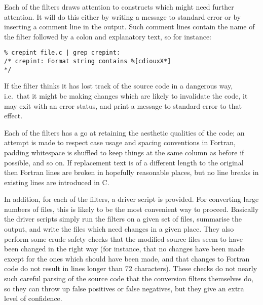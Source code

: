 \documentclass[twoside,11pt]{article}
\renewcommand{\_}{\texttt{\symbol{95}}}
\begin{document}
Each of the filters draws attention to constructs which might need 
further attention.  It will do this either by writing a message to
standard error or by inserting a comment line in the output.
Such comment lines contain the name of the filter followed by a colon
and explanatory text, so for instance:
\begin{squote}
\begin{verbatim}
% crepint file.c | grep crepint:
/* crepint: Format string contains %[cdiouxX*]                           */
\end{verbatim}
\end{squote}
If the filter thinks it has lost track of the source code in a dangerous
way, i.e.\ that it might be making changes which are likely to invalidate
the code, it may exit with an error status, and print a message to standard
error to that effect.

Each of the filters has a go at retaining the aesthetic 
qualities of the code; an attempt is made to respect 
case usage and spacing conventions in Fortran, 
padding whitespace is shuffled to keep things at the same column as
before if possible, and so on.
If replacement text is of a different length to the original
then Fortran lines are broken in hopefully reasonable places,
but no line breaks in existing lines are introduced in C.

In addition, for each of the filters, a driver script is provided. 
For converting large numbers of files, this is likely to be the 
most convenient way to proceed.  Basically the driver scripts simply
run the filters on a given set of files, summarise the output, and
write the files which need changes in a given place.
They also perform some crude safety checks that the modified source
files seem to have been changed in the right way (for instance, that
no changes have been made except for the ones which should have been
made, and that changes to Fortran code do not result in lines longer
than 72 characters).  
These checks do not nearly such careful parsing
of the source code that the conversion filters themselves do, so
they can throw up false positives or false negatives, but they give 
an extra level of confidence.
\end{document}
